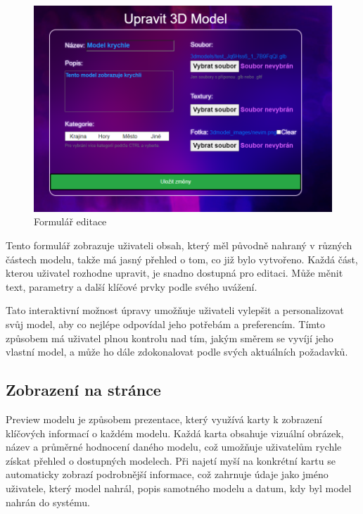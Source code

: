 \documentclass[12pt, a4paper,
twoside,        %
openright
]{report}
\begin{document}
\begin{figure}[h]
			\centering
			\includegraphics[width=1\linewidth]{image/edit.png} 
			\caption{Formulář editace}
		\end{figure}
		
Tento formulář zobrazuje uživateli obsah, který měl původně nahraný v různých částech modelu, takže má jasný přehled o tom, co již bylo vytvořeno. Každá část, kterou uživatel rozhodne upravit, je snadno dostupná pro editaci. Může měnit text, parametry a další klíčové prvky podle svého uvážení.


Tato interaktivní možnost úpravy umožňuje uživateli vylepšit a personalizovat svůj model, aby co nejlépe odpovídal jeho potřebám a preferencím. Tímto způsobem má uživatel plnou kontrolu nad tím, jakým směrem se vyvíjí jeho vlastní model, a může ho dále zdokonalovat podle svých aktuálních požadavků.
\subsection[Zobrazení na stránce]{Zobrazení na stránce}
Preview modelu je způsobem prezentace, který využívá karty k zobrazení klíčových informací o každém modelu. Každá karta obsahuje vizuální obrázek, název a průměrné hodnocení daného modelu, což umožňuje uživatelům rychle získat přehled o dostupných modelech. Při najetí myší na konkrétní kartu se automaticky zobrazí podrobnější informace, což zahrnuje údaje jako jméno uživatele, který model nahrál, popis samotného modelu a datum, kdy byl model nahrán do systému.
\end{document}

